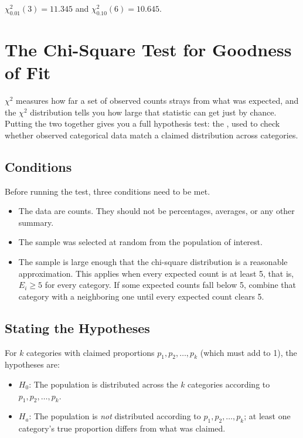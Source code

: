 \begin{Answer}[ref={ex:chisq-table-read}]
$\chi^2_{0.01}(3) = 11.345$ and $\chi^2_{0.10}(6) = 10.645$.
\end{Answer}


\section{The Chi-Square Test for Goodness of Fit}

$\chi^2$ measures how far a set of observed counts strays from what was expected, and the $\chi^2$ distribution tells you how large that statistic can get just by chance. Putting the two together gives you a full hypothesis test: the , used to check whether observed categorical data match a claimed distribution across categories.

\subsection{Conditions}

Before running the test, three conditions need to be met.

\begin{itemize}
    \item The data are counts. They should not be percentages, averages, or any other summary.
    \item The sample was selected at random from the population of interest.
    \item The sample is large enough that the chi-square distribution is a reasonable approximation. This applies when every expected count is at least 5, that is, $E_i \geq 5$ for every category. If some expected counts fall below 5, combine that category with a neighboring one until every expected count clears 5.
\end{itemize}

\subsection{Stating the Hypotheses}

For $k$ categories with claimed proportions $p_1, p_2, \ldots, p_k$ (which must add to 1), the hypotheses are:

\begin{itemize}
    \item $H_0$: The population is distributed across the $k$ categories according to $p_1, p_2, \ldots, p_k$.
    \item $H_a$: The population is \emph{not} distributed according to $p_1, p_2, \ldots, p_k$; at least one category's true proportion differs from what was claimed.
\end{itemize}

